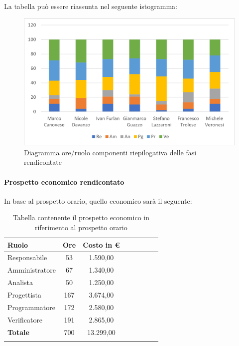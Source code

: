La tabella può essere riassunta nel seguente istogramma:

\begin{figure}[H]
	\centering
	\includegraphics[width=0.8\linewidth]{res/images/preventivo/totrend1.png}
	\caption{Diagramma ore/ruolo componenti riepilogativa delle fasi rendicontate}
	\label{fig:diagramma suddivisione ruoli riepilogativa delle fasi rendicontate}
\end{figure}

\paragraph{Prospetto economico rendicontato}
In base al prospetto orario, quello economico sarà il seguente:

\begin{longtable}{|l|c|c|c|c|c|c|c|}
	\hline
	\rowcolor{lighter-grayer}
	\textbf{Ruolo}  & \textbf{Ore} & \textbf{Costo in €} \\
	\hline
	\endfirsthead

	\hline
	Responsabile    & 53           & 1.590,00            \\
	\hline
	\hline
	Amministratore  & 67           & 1.340,00            \\
	\hline
	\hline
	Analista        & 50           & 1.250,00            \\
	\hline
	\hline
	Progettista     & 167          & 3.674,00            \\
	\hline
	\hline
	Programmatore   & 172          & 2.580,00            \\
	\hline
	\hline
	Verificatore    & 191          & 2.865,00            \\
	\hline
	\hline
	\textbf{Totale} & 700          & 13.299,00           \\
	\hline
	\rowcolor{white}
	\caption{Tabella contenente il prospetto economico in riferimento al prospetto orario}
\end{longtable}
\pagebreak

